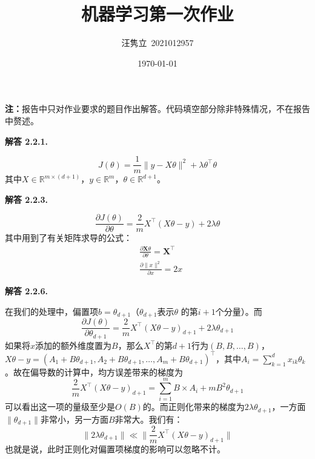 \documentclass[12pt, a4paper, oneside]{ctexart}
\title{\textbf{机器学习第一次作业}}
\author{汪隽立\ 2021012957}
\date{\today}
\newenvironment{solution}[1]{\par\noindent\textbf{解答 #1. }\par}{\par}
\begin{document}
\maketitle

\par\noindent \textbf{注：}报告中只对作业要求的题目作出解答。代码填空部分除非特殊情况，不在报告中赘述。

\begin{solution}{2.2.1}
    \begin{equation}
        J(\theta) = \frac{1}{m} \| y - X\theta \| ^ 2 + \lambda \theta ^ \top \theta \nonumber
    \end{equation}
    其中$X \in \mathbb{R}^{m\times (d+1)}$，$y \in \mathbb{R}^{m}$，$\theta \in \mathbb{R}^{d+1}$。
\end{solution}

\begin{solution}{2.2.3}
    \begin{equation}
        \frac{\partial{J(\theta)}}{\partial \theta} = \frac{2}{m} X^\top (X\theta - y) + 2\lambda \theta \nonumber
    \end{equation}
    其中用到了有关矩阵求导的公式：
    \begin{align}
        &\frac{\partial{\mathbf{X}\theta}}{\partial{\theta}} = \mathbf{X}^\top \nonumber \\
        &\frac{\partial{\| x \|^2}}{\partial{x}} = 2x \nonumber
    \end{align}
\end{solution}

\begin{solution}{2.2.6}
    在我们的处理中，偏置项$b = \theta_{d+1}$（$\theta_{d+1}$表示$\theta$ 的第$i+1$个分量）。而
    \begin{equation}
        \frac{\partial{J(\theta)}}{\partial \theta_{d+1}} = \frac{2}{m} X^\top \left(X\theta - y\right)_{d+1} + 2\lambda \theta_{d+1} \nonumber
    \end{equation}
    如果将$x$添加的额外维度置为$B$，那么$X^\top$的第$d+1$行为$\left( B, B, \dots, B \right)$，$X\theta - y = \left( A_1 + B\theta_{d+1}, A_2 + B\theta_{d+1}, \dots, A_m + B\theta_{d+1}\right)^\top$，其中$A_i = \sum_{k=1}^{d} x_{ik}\theta_k$。故在偏导数的计算中，均方误差带来的梯度为
    \begin{equation}
        \frac{2}{m} X^\top (X\theta - y)_{d+1} = \sum_{i=1}^{m} B \times A_i + mB^2\theta_{d+1} \nonumber
    \end{equation}
    可以看出这一项的量级至少是$O(B)$的。而正则化带来的梯度为$2\lambda \theta_{d+1}$，一方面$\| \theta_{d+1} \|$非常小，另一方面$B$非常大。我们有：
    \begin{equation}
        \| 2\lambda \theta_{d+1} \| \ll \| \frac{2}{m} X^\top (X\theta - y)_{d+1} \| \nonumber
    \end{equation}
    也就是说，此时正则化对偏置项梯度的影响可以忽略不计。
\end{solution}
\end{document}
